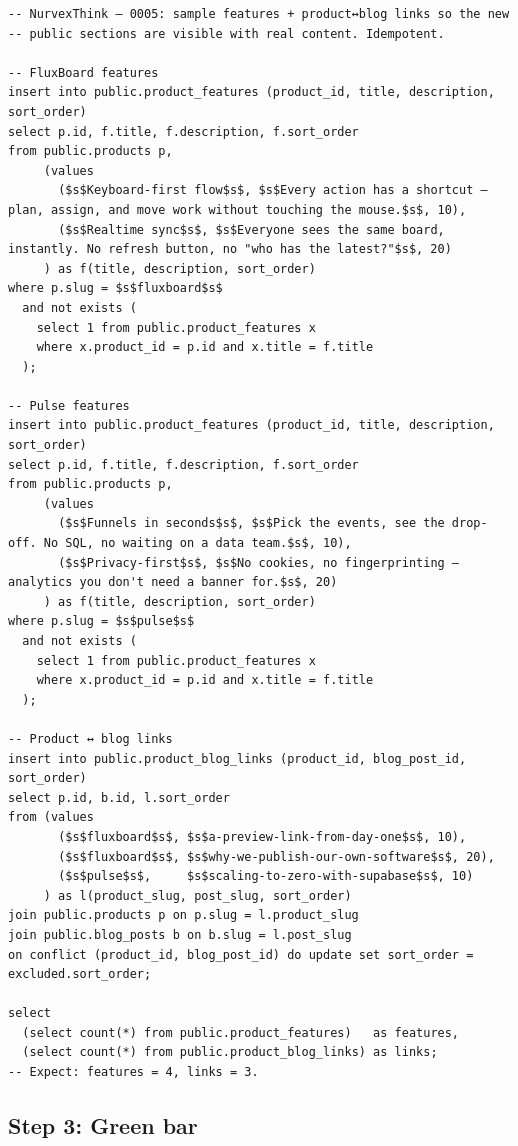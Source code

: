 \documentclass[11pt,a4paper]{article}
\begin{document}
\begin{lstlisting}
-- NurvexThink — 0005: sample features + product↔blog links so the new
-- public sections are visible with real content. Idempotent.

-- FluxBoard features
insert into public.product_features (product_id, title, description, sort_order)
select p.id, f.title, f.description, f.sort_order
from public.products p,
     (values
       ($s$Keyboard-first flow$s$, $s$Every action has a shortcut — plan, assign, and move work without touching the mouse.$s$, 10),
       ($s$Realtime sync$s$, $s$Everyone sees the same board, instantly. No refresh button, no "who has the latest?"$s$, 20)
     ) as f(title, description, sort_order)
where p.slug = $s$fluxboard$s$
  and not exists (
    select 1 from public.product_features x
    where x.product_id = p.id and x.title = f.title
  );

-- Pulse features
insert into public.product_features (product_id, title, description, sort_order)
select p.id, f.title, f.description, f.sort_order
from public.products p,
     (values
       ($s$Funnels in seconds$s$, $s$Pick the events, see the drop-off. No SQL, no waiting on a data team.$s$, 10),
       ($s$Privacy-first$s$, $s$No cookies, no fingerprinting — analytics you don't need a banner for.$s$, 20)
     ) as f(title, description, sort_order)
where p.slug = $s$pulse$s$
  and not exists (
    select 1 from public.product_features x
    where x.product_id = p.id and x.title = f.title
  );

-- Product ↔ blog links
insert into public.product_blog_links (product_id, blog_post_id, sort_order)
select p.id, b.id, l.sort_order
from (values
       ($s$fluxboard$s$, $s$a-preview-link-from-day-one$s$, 10),
       ($s$fluxboard$s$, $s$why-we-publish-our-own-software$s$, 20),
       ($s$pulse$s$,     $s$scaling-to-zero-with-supabase$s$, 10)
     ) as l(product_slug, post_slug, sort_order)
join public.products p on p.slug = l.product_slug
join public.blog_posts b on b.slug = l.post_slug
on conflict (product_id, blog_post_id) do update set sort_order = excluded.sort_order;

select
  (select count(*) from public.product_features)   as features,
  (select count(*) from public.product_blog_links) as links;
-- Expect: features = 4, links = 3.
\end{lstlisting}

\subsection*{Step 3: Green bar}
\end{document}
